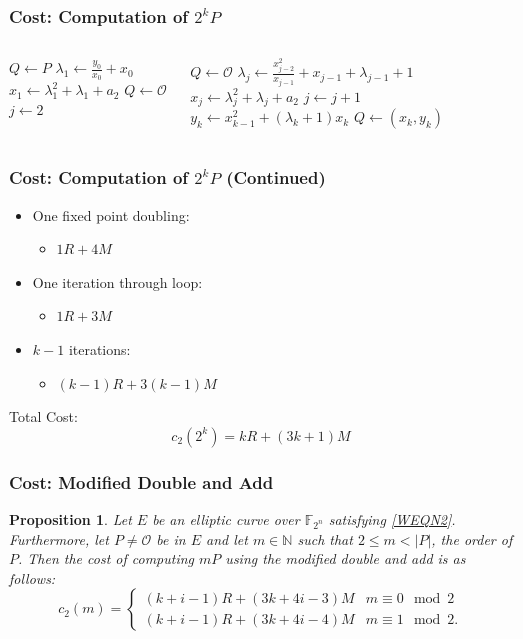 \documentclass[xcolor=pdftex,dvipsnames,table]{beamer}
\theoremstyle{plain}
\newtheorem{prop}[thm]{Proposition}
\theoremstyle{definition}
\def\NN{\mathbb{N}}
\def\FF{\mathbb{F}}
\begin{document}
\begin{frame}
	\frametitle{Cost: Computation of $2^kP$}
	\begin{columns}[T]
		\begin{algorithmic}
			\State $Q\gets P$
			\EndIf
			\State $\displaystyle \lambda_1\gets\frac{y_0}{x_0}+x_0$
			\State $\displaystyle x_1 \gets \lambda_1^2+\lambda_1+a_2$
			\State $Q\gets\mathcal{O}$
			\EndIf
			\State $j \gets 2$
		\end{algorithmic}
		\column{0.6\textwidth}
		\begin{algorithmic}
			\While{$j\leq k$}
			\If{$x_{j-1}=0$}
			\State  $Q\gets\mathcal{O}$
			\EndIf
			\State $\displaystyle \lambda_j\gets\frac{x_{j-2}^2}{x_{j-1}}+x_{j-1}+\lambda_{j-1}+1$
			\State $x_j\gets \lambda_j^2+\lambda_j+a_2$
			\State $j\gets j+1$
			\EndWhile
			\State $y_k\gets x_{k-1}^2+(\lambda_{k}+1)x_k$
			\State $Q\gets(x_k,y_k)$
		\end{algorithmic}
	\end{columns}
\end{frame}

\begin{frame}
	\frametitle{Cost: Computation of $2^kP$ (Continued)}
	
	\begin{itemize}
		\item One fixed point doubling: 
		\begin{itemize}
			\item $1R+4M$
		\end{itemize}
		\item One iteration through loop:
		\begin{itemize}
			\item $1R+3M$
		\end{itemize}
		\item $k-1$ iterations:
		\begin{itemize}
			\item $(k-1)R+3(k-1)M$
		\end{itemize}
	\end{itemize}
	Total Cost:
	\[
	c_2(2^k)=kR+(3k+1)M
	\]
\end{frame}

\begin{frame}
	\frametitle{Cost: Modified Double and Add}
	
	\begin{prop}
		Let $E$ be an elliptic curve over $\FF_{2^n}$ satisfying \autoref{WEQN2}.
		Furthermore, let $P\neq\mathcal{O}$ be in $E$ and let $m\in\NN$ such that $2\leq m< |P|$, the order of $P$.
		Then the cost of computing $mP$ using the modified double and add is as follows:
		\[
		c_2(m) = \begin{cases}
		(k+i-1)R + (3k+4i -3)M & m\equiv 0 \mod{2}\\
		( k+ i-1)R+(3 k+4i-4)M & m\equiv 1 \mod{2}.
		\end{cases}
		\]
	\end{prop}
\end{frame}
\end{document}
